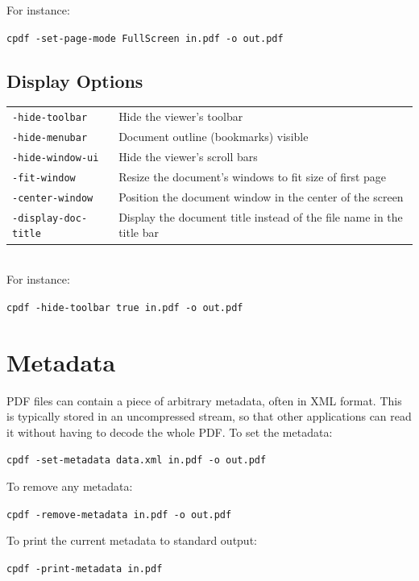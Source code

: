 \documentclass[a4paper,makeidx]{memoir}
\begin{document}
  \noindent For instance:
  \begin{framed}
    \small\verb!cpdf -set-page-mode FullScreen in.pdf -o out.pdf!
  \end{framed}
  
  \subsection{Display Options}
\vspace{2mm}
  \begin{tabular}{ll}
    \texttt{-hide-toolbar} & \vspace{2mm} \parbox{8cm}{Hide the viewer's toolbar} \\
    \texttt{-hide-menubar} & \vspace{2mm} \parbox{8cm}{Document outline (bookmarks) visible} \\
    \texttt{-hide-window-ui} & \vspace{2mm} \parbox{8cm}{Hide the viewer's scroll bars} \\
    \texttt{-fit-window} & \vspace{2mm} \parbox{8cm}{Resize the document's windows to fit size of first page} \\
    \texttt{-center-window} & \vspace{2mm} \parbox{8cm}{Position the document window in the center of the screen} \\
    \texttt{-display-doc-title} & \vspace{2mm} \parbox{8cm}{Display the document title instead of the file name in the title bar}
  \end{tabular}\\

  \noindent For instance:
  \begin{framed}
    \small\verb!cpdf -hide-toolbar true in.pdf -o out.pdf!
  \end{framed}

  \section{Metadata}
  PDF files can contain a piece of arbitrary metadata, often in XML format.
This is typically stored in an uncompressed stream, so that other applications
can read it without having to decode the whole PDF. To set the metadata:
  \begin{framed}
    \small\verb!cpdf -set-metadata data.xml in.pdf -o out.pdf!
  \end{framed}
  \noindent To remove any metadata:
  \begin{framed}
    \small\verb!cpdf -remove-metadata in.pdf -o out.pdf!
  \end{framed}
  \noindent To print the current metadata to standard output:
  \begin{framed}
    \small\verb!cpdf -print-metadata in.pdf!
  \end{framed}
\end{document}
